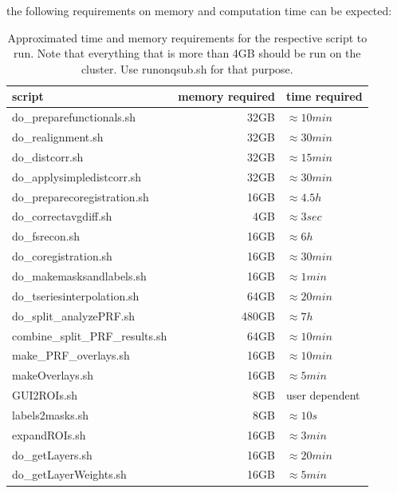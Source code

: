 \documentclass[12pt,a4paper]{scrartcl}
\begin{document}
\noindent the following requirements on memory and computation time can be expected:

\begin{table}[h]
\centering
\begin{tabular}{l | r | l}
\toprule
script & memory required & time required\\\hline
	do\_preparefunctionals.sh & 32GB & $\approx 10min$ \\\hline
  do\_realignment.sh & 32GB & $\approx 30min$ \\\hline
  do\_distcorr.sh & 32GB & $\approx 15min$ \\\hline
  do\_applysimpledistcorr.sh & 32GB & $\approx 30min$ \\\hline
  do\_preparecoregistration.sh & 16GB & $\approx 4.5h$ \\\hline
  do\_correctavgdiff.sh & 4GB & $\approx 3sec$ \\\hline
	do\_fsrecon.sh & 16GB & $\approx 6h$ \\\hline
  do\_coregistration.sh & 16GB & $\approx 30min$ \\\hline
	do\_makemasksandlabels.sh & 16GB & $\approx 1min$ \\\hline
	do\_tseriesinterpolation.sh & 64GB & $\approx 20min$ \\\hline
	do\_split\_analyzePRF.sh & 480GB & $\approx 7h$ \\\hline
	combine\_split\_PRF\_results.sh & 64GB & $\approx 10min$ \\\hline
  make\_PRF\_overlays.sh & 16GB & $\approx 10min$ \\\hline
	makeOverlays.sh & 16GB & $\approx 5min$\\\hline
	GUI2ROIs.sh & 8GB & user dependent \\\hline
  labels2masks.sh & 8GB & $\approx 10s$ \\\hline
  expandROIs.sh & 16GB & $\approx 3min$ \\\hline
  do\_getLayers.sh & 16GB & $\approx 20min$ \\\hline
  do\_getLayerWeights.sh & 16GB & $\approx 5min$ \\\bottomrule
\end{tabular}
\caption[Approximated time and memory requirements when running on qsub]{Approximated time and memory requirements for the respective script to run. Note that everything that is more than 4GB should be run on the cluster. Use runonqsub.sh for that purpose.}
\label{tab:hardwarerequirements}
\end{table}
\end{document}
